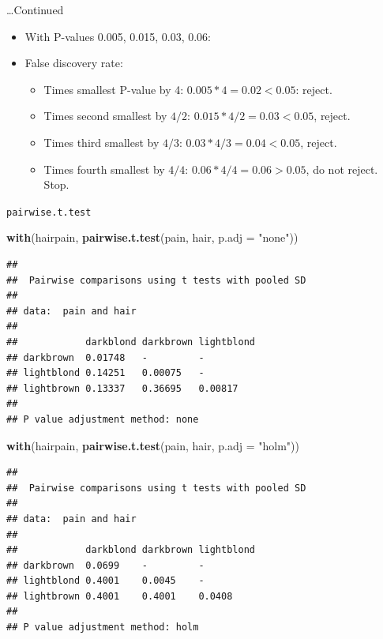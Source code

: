 \documentclass[
  ignorenonframetext,
]{beamer}
\newenvironment{Shaded}{\begin{snugshade}}{\end{snugshade}}
\newcommand{\DataTypeTok}[1]{\textcolor[rgb]{0.13,0.29,0.53}{#1}}
\newcommand{\KeywordTok}[1]{\textcolor[rgb]{0.13,0.29,0.53}{\textbf{#1}}}
\newcommand{\NormalTok}[1]{#1}
\newcommand{\StringTok}[1]{\textcolor[rgb]{0.31,0.60,0.02}{#1}}
\begin{document}
\begin{frame}{\ldots Continued}
\protect\hypertarget{continued}{}

\begin{itemize}
\item
  With P-values 0.005, 0.015, 0.03, 0.06:
\item
  False discovery rate:

  \begin{itemize}
  \item
    Times smallest P-value by 4: \(0.005*4=0.02<0.05\): reject.
  \item
    Times second smallest by \(4/2\): \(0.015*4/2=0.03<0.05\), reject.
  \item
    Times third smallest by \(4/3\): \(0.03*4/3=0.04<0.05\), reject.
  \item
    Times fourth smallest by \(4/4\): \(0.06*4/4=0.06>0.05\), do not
    reject. Stop.
  \end{itemize}
\end{itemize}

\end{frame}

\begin{frame}[fragile]{\texttt{pairwise.t.test}}
\protect\hypertarget{pairwise.t.test}{}

\tiny

\begin{Shaded}
\begin{Highlighting}[]
\KeywordTok{with}\NormalTok{(hairpain, }\KeywordTok{pairwise.t.test}\NormalTok{(pain, hair, }\DataTypeTok{p.adj =} \StringTok{"none"}\NormalTok{))}
\end{Highlighting}
\end{Shaded}

\begin{verbatim}
## 
##  Pairwise comparisons using t tests with pooled SD 
## 
## data:  pain and hair 
## 
##            darkblond darkbrown lightblond
## darkbrown  0.01748   -         -         
## lightblond 0.14251   0.00075   -         
## lightbrown 0.13337   0.36695   0.00817   
## 
## P value adjustment method: none
\end{verbatim}

\begin{Shaded}
\begin{Highlighting}[]
\KeywordTok{with}\NormalTok{(hairpain, }\KeywordTok{pairwise.t.test}\NormalTok{(pain, hair, }\DataTypeTok{p.adj =} \StringTok{"holm"}\NormalTok{))}
\end{Highlighting}
\end{Shaded}

\begin{verbatim}
## 
##  Pairwise comparisons using t tests with pooled SD 
## 
## data:  pain and hair 
## 
##            darkblond darkbrown lightblond
## darkbrown  0.0699    -         -         
## lightblond 0.4001    0.0045    -         
## lightbrown 0.4001    0.4001    0.0408    
## 
## P value adjustment method: holm
\end{verbatim}

\normalsize

\end{frame}
\end{document}
